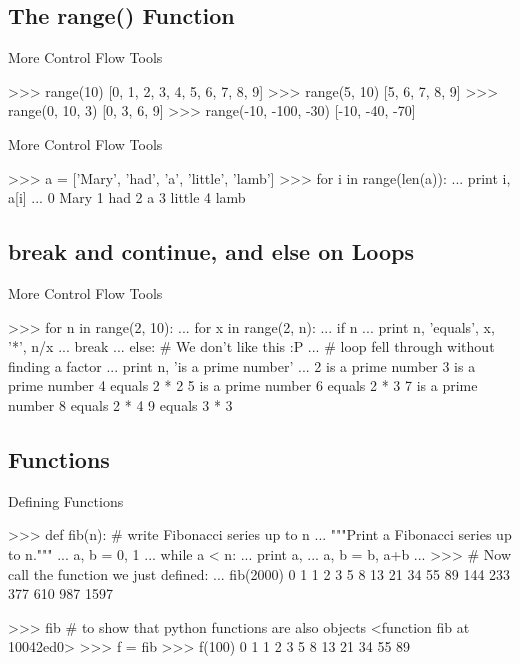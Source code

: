 \documentclass[11pt]{beamer}
\begin{document}
\subsection{The range() Function}
\begin{frame}[containsverbatim]{More Control Flow Tools}
\begin{python}
>>> range(10)
[0, 1, 2, 3, 4, 5, 6, 7, 8, 9]
>>> range(5, 10)
[5, 6, 7, 8, 9]
>>> range(0, 10, 3)
[0, 3, 6, 9]
>>> range(-10, -100, -30)
[-10, -40, -70]
\end{python}
\end{frame}


\begin{frame}[containsverbatim]{More Control Flow Tools}
\begin{python}
>>> a = ['Mary', 'had', 'a', 'little', 'lamb']
>>> for i in range(len(a)):
...    print i, a[i]
...
0 Mary
1 had
2 a
3 little
4 lamb
\end{python}
\end{frame}

\subsection{break and continue, and else on Loops}
\begin{frame}[containsverbatim]{More Control Flow Tools}
\begin{python}
>>> for n in range(2, 10):
...    for x in range(2, n):
...        if n %
...            print n, 'equals', x, '*', n/x
...            break
...    else: # We don't like this :P
...        # loop fell through without finding a factor
...        print n, 'is a prime number'
...
2 is a prime number
3 is a prime number
4 equals 2 * 2
5 is a prime number
6 equals 2 * 3
7 is a prime number
8 equals 2 * 4
9 equals 3 * 3
\end{python}
\end{frame}

\subsection{Functions}
\begin{frame}[containsverbatim]{Defining Functions}
\begin{python}
>>> def fib(n):    # write Fibonacci series up to n
...    """Print a Fibonacci series up to n."""
...    a, b = 0, 1
...    while a < n:
...        print a,
...        a, b = b, a+b
...
>>> # Now call the function we just defined:
... fib(2000)
0 1 1 2 3 5 8 13 21 34 55 89 144 233 377 610 987 1597

>>> fib # to show that python functions are also objects
<function fib at 10042ed0>
>>> f = fib
>>> f(100)
0 1 1 2 3 5 8 13 21 34 55 89
\end{python}
\end{frame}
\end{document}
